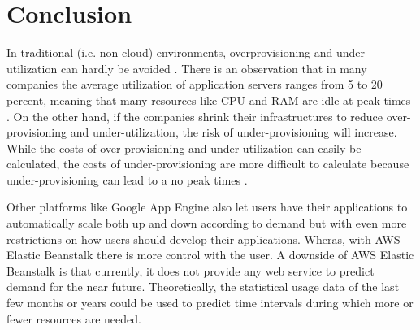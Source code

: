 \documentclass[9pt,twocolumn,twoside]{../../styles/osajnl}
\begin{document}

\section{Conclusion}

In traditional (i.e. non-cloud) environments, overprovisioning and
under-utilization can hardly be avoided \cite{cloudcomuting}. There is
an observation that in many companies the average utilization of
application servers ranges from 5 to 20 percent, meaning that many
resources like CPU and RAM are idle at peak times
\cite{cloudcomputing-2}.  On the other hand, if the companies shrink
their infrastructures to reduce over-provisioning and
under-utilization, the risk of under-provisioning will increase. While
the costs of over-provisioning and under-utilization can easily be
calculated, the costs of under-provisioning are more difficult to
calculate because under-provisioning can lead to a no peak times
\cite{cloudcomputing-2}.

Other platforms like Google App Engine \cite{google-appengine} also
let users have their applications to automatically scale both up and
down according to demand but with even more restrictions on how users
should develop their applications. Wheras, with AWS Elastic Beanstalk
there is more control with the user. A downside of AWS Elastic
Beanstalk is that currently, it does not provide any web service to
predict demand for the near future. Theoretically, the statistical
usage data of the last few months or years could be used to predict
time intervals during which more or fewer resources are needed.




 
\end{document}
